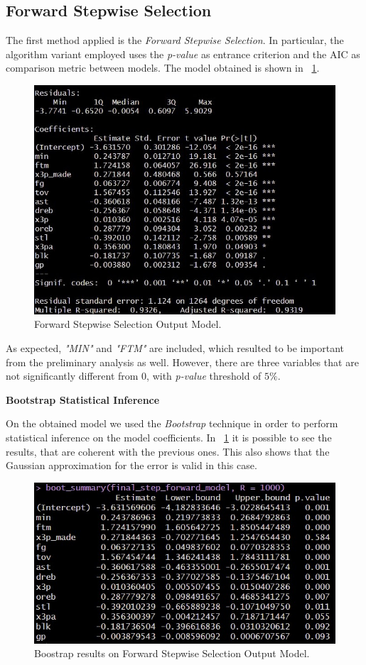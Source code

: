 \subsection{Forward Stepwise Selection}

The first method applied is the \textit{Forward Stepwise Selection}. In particular, the algorithm variant employed uses the \textit{p-value} as entrance criterion and the AIC as comparison metric between models. The model obtained is shown in \Fig~\ref{fig:ForwardModelSummary}.
\begin{figure}[h]
	\centering
	\includegraphics[width=0.35\linewidth]{ImageFiles/Regression/Forward/ForwardModelSummary}
	\caption{Forward Stepwise Selection Output Model.}
	\label{fig:ForwardModelSummary}
\end{figure}

As expected, \textit{"MIN"} and \textit{"FTM"} are included, which resulted to be important from the preliminary analysis as well. However, there are three variables that are not significantly different from 0, with \textit{p-value} threshold of $5\%$.

\vspace{0.2cm}
\noindent
\textbf{Bootstrap Statistical Inference}

On the obtained model we used the \textit{Bootstrap} technique in order to perform statistical inference on the model coefficients. In \Fig~\ref{fig:ForwardModelSummary} it is possible to see the results, that are coherent with the previous ones. This also shows that the Gaussian approximation for the error is valid in this case.
\begin{figure}[h]
	\centering
	\includegraphics[width=0.4\linewidth]{ImageFiles/Regression/Forward/BootForwardModel}
	\caption{Boostrap results on Forward Stepwise Selection Output Model.}
	\label{fig:BootForwardModel}
\end{figure}

